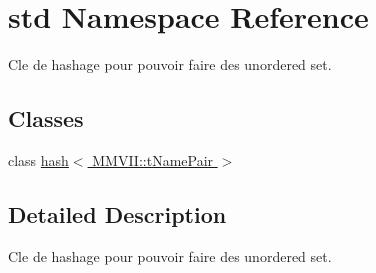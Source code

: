 \hypertarget{namespacestd}{}\section{std Namespace Reference}
\label{namespacestd}


Cle de hashage pour pouvoir faire des unordered set.  


\subsection*{Classes}
\begin{DoxyCompactItemize}
\item 
class \hyperlink{classstd_1_1hash_3_01MMVII_1_1tNamePair_01_4}{hash$<$ M\+M\+V\+I\+I\+::t\+Name\+Pair $>$}
\end{DoxyCompactItemize}


\subsection{Detailed Description}
Cle de hashage pour pouvoir faire des unordered set. 